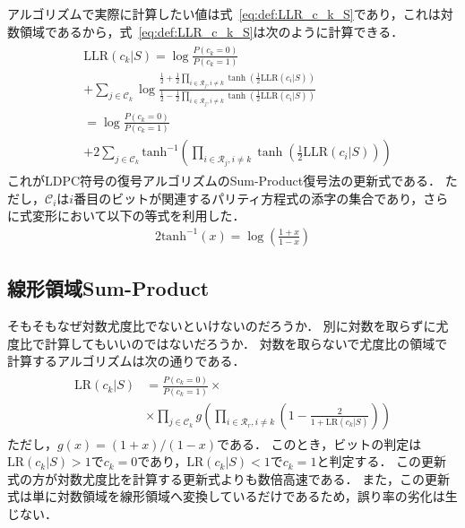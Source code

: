 \documentclass[twocolumn, a4paper]{ieicejsp}
\newcommand{\brkts}[1]{\left(#1\right)}
\newcommand{\arctanh}{\mathrm{tanh}^{-1}}
\begin{document}
アルゴリズムで実際に計算したい値は式~\eqref{eq:def:LLR_c_k_S}であり，これは対数領域であるから，式~\eqref{eq:def:LLR_c_k_S}は次のように計算できる．
\begin{align}
  \begin{split}
    &\mathrm{LLR}(c_k|S) = \log \frac{P(c_k=0)}{P(c_k=1)} \\
    &+ \sum_{j \in \mathcal{C}_k} \log \frac{  \frac{1}{2} + \frac{1}{2} \prod_{i \in \mathcal{R}_j, i \not= k} \tanh\brkts{\frac{1}{2} \mathrm{LLR}(c_i|S) } }{  \frac{1}{2} - \frac{1}{2} \prod_{i \in \mathcal{R}_j, i \not= k} \tanh\brkts{\frac{1}{2} \mathrm{LLR}(c_i|S) } } \\
    &= \log \frac{P(c_k=0)}{P(c_k=1)} \\
    &+ 2 \sum_{j\in \mathcal{C}_k } \arctanh\brkts{ \prod_{i \in \mathcal{R}_j, i \not= k} \tanh\brkts{\frac{1}{2} \mathrm{LLR}(c_i|S) } }
  \end{split}
\end{align}
これがLDPC符号の復号アルゴリズムのSum-Product復号法の更新式である．
ただし，$\mathcal{C}_i$は$i$番目のビットが関連するパリティ方程式の添字の集合であり，さらに式変形において以下の等式を利用した．
\begin{align}
  2 \arctanh(x) = \log \brkts{\frac{1+x}{1-x}}
\end{align}


\subsection{線形領域Sum-Product}

そもそもなぜ対数尤度比でないといけないのだろうか．
別に対数を取らずに尤度比で計算してもいいのではないだろうか．
対数を取らないで尤度比の領域で計算するアルゴリズムは次の通りである．
\begin{align}
  \begin{split}
    \mathrm{LR}(c_k|S) &= \frac{P(c_k=0)}{P(c_k=1)} \times \\
    &\times \prod_{j \in \mathcal{C}_k} g\brkts{\prod_{i \in \mathcal{R}_r,i\not=k} \brkts{ 1 - \frac{2}{1+ \mathrm{LR}(c_k|S) } } }
  \end{split}
\end{align}
ただし，$g(x)=(1+x)/(1-x)$である．
このとき，ビットの判定は$\mathrm{LR}(c_k|S) > 1$で$c_k=0$であり，$\mathrm{LR}(c_k|S) < 1$で$c_k=1$と判定する．
この更新式の方が対数尤度比を計算する更新式よりも数倍高速である．
また，この更新式は単に対数領域を線形領域へ変換しているだけであるため，誤り率の劣化は生じない．
\end{document}
